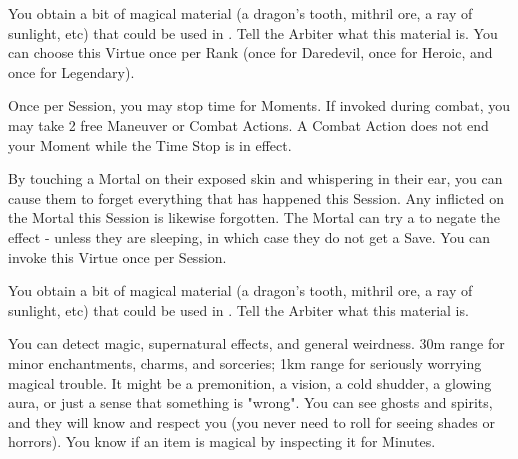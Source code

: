 \begin{multicols*}{2}


You obtain a bit of magical material (a dragon's tooth, mithril ore, a ray of sunlight, etc) that could be used in .  Tell the Arbiter what this material is.  You can choose this Virtue once per Rank (once for Daredevil, once for Heroic, and once for Legendary).



Once per Session, you may stop time for Moments. If invoked during combat, you may take 2 free Maneuver or Combat Actions. A Combat Action does not end your Moment while the Time Stop is in effect.

\cbreak


By touching a Mortal on their exposed skin and whispering in their ear, you can cause them to forget everything that has happened this Session. Any \INSANITY inflicted on the Mortal this Session is likewise forgotten. The Mortal can try a  to negate the effect - unless they are sleeping, in which case they do not get a Save. You can invoke this Virtue once per Session.


You obtain a bit of magical material (a dragon's tooth, mithril ore, a ray of sunlight, etc) that could be used in .  Tell the Arbiter what this material is.


You can detect magic, supernatural effects, and general weirdness. 30m range for minor enchantments, charms, and sorceries; 1km range for seriously worrying magical trouble. It might be a premonition, a vision, a cold shudder, a glowing aura, or just a sense that something is "wrong". You can see ghosts and spirits, and they will know and respect you (you never need to roll \INSANITY for seeing shades or horrors). You know if an item is magical by inspecting it for Minutes.


\end{multicols*}
